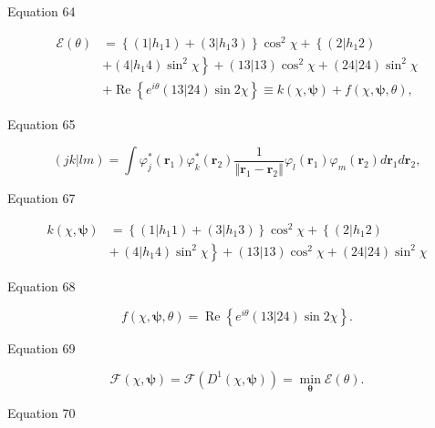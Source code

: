 \documentclass[aps]{revtex4}%
\begin{document}
Equation 64%

\begin{align*}
\mathcal{E}\left(  \theta\right)   &  =\left\{  \left(  1\left\vert
h_{1}1\right.  \right)  +\left(  3\left\vert h_{1}3\right.  \right)  \right\}
\cos^{2}\chi+\left\{  \left(  2\left\vert h_{1}2\right.  \right)  \right. \\
&  +\left.  \left(  4\left\vert h_{1}4\right.  \right)  \sin^{2}\chi\right\}
+\left(  \left.  13\right\vert 13\right)  \cos^{2}\chi+\left(  \left.
24\right\vert 24\right)  \sin^{2}\chi\\
&  +\operatorname{Re}\left\{  e^{i\theta}\left(  \left.  13\right\vert
24\right)  \sin2\chi\right\}  \equiv k\left(  \chi,\boldsymbol{\psi}\right)
+f\left(  \chi,\boldsymbol{\psi},\theta\right)  ,
\end{align*}


Equation 65%

\[
\left(  \left.  jk\right\vert lm\right)  =\int\varphi_{j}^{\ast}\left(
\boldsymbol{r}_{1}\right)  \varphi_{k}^{\ast}\left(  \boldsymbol{r}%
_{2}\right)  \frac{1}{\left\Vert \boldsymbol{r}_{1}-\boldsymbol{r}%
_{2}\right\Vert }\varphi_{l}\left(  \boldsymbol{r}_{1}\right)  \varphi
_{m}\left(  \boldsymbol{r}_{2}\right)  d\boldsymbol{r}_{1}d\boldsymbol{r}%
_{2},
\]


Equation 67%

\begin{align*}
k\left(  \chi,\boldsymbol{\psi}\right)   &  =\left\{  \left(  1\left\vert
h_{1}1\right.  \right)  +\left(  3\left\vert h_{1}3\right.  \right)  \right\}
\cos^{2}\chi+\left\{  \left(  2\left\vert h_{1}2\right.  \right)  \right. \\
&  \left.  +\,\left(  4\left\vert h_{1}4\right.  \right)  \sin^{2}%
\chi\right\}  +\left(  \left.  13\right\vert 13\right)  \cos^{2}\chi+\left(
\left.  24\right\vert 24\right)  \sin^{2}\chi
\end{align*}


Equation 68%

\[
f\left(  \chi,\boldsymbol{\psi},\theta\right)  =\operatorname{Re}\left\{
e^{i\theta}\left(  \left.  13\right\vert 24\right)  \sin2\chi\right\}  .
\]


Equation 69%

\[
\mathcal{F}\left(  \chi,\boldsymbol{\psi}\right)  =\mathcal{F}\left(
D^{1}\left(  \chi,\boldsymbol{\psi}\right)  \right)  =\min_{\boldsymbol{\theta
}}\mathcal{E}\left(  \theta\right)  .
\]


Equation 70%
\end{document}
